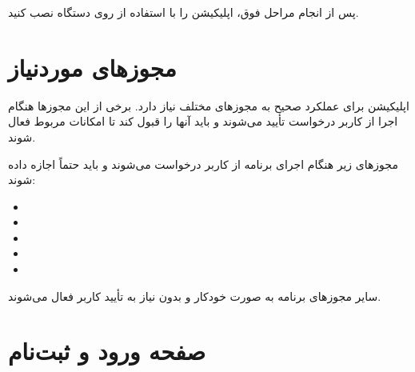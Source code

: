 \documentclass{report}
\begin{document}
\vspace{0.5cm}

پس از انجام مراحل فوق، اپلیکیشن را با استفاده از  روی دستگاه نصب کنید.

\section{مجوزهای موردنیاز}

اپلیکیشن برای عملکرد صحیح به مجوزهای مختلف نیاز دارد. برخی از این مجوزها هنگام اجرا از کاربر درخواست تأیید می‌شوند و باید آنها را قبول کند تا امکانات مربوط فعال شوند.

مجوزهای زیر هنگام اجرای برنامه از کاربر درخواست می‌شوند و باید حتماً اجازه داده شوند:

\begin{itemize}
	\item {}
	\item {}
	\item {}
	\item {}
	\item {}
\end{itemize}

سایر مجوزهای برنامه به صورت خودکار و بدون نیاز به تأیید کاربر فعال می‌شوند.

\section{صفحه ورود و ثبت‌نام}
\end{document}
